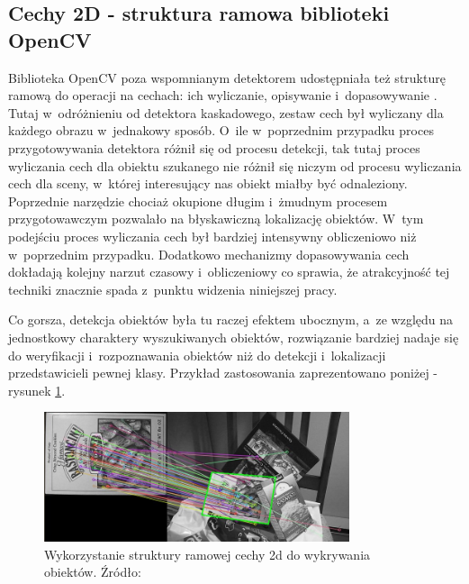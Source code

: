 \subsection{Cechy 2D - struktura ramowa biblioteki OpenCV}

Biblioteka OpenCV poza wspomnianym detektorem udostępniała też
strukturę ramową do operacji na cechach: ich wyliczanie, opisywanie
i~dopasowywanie \cite{OCV:feture2dframework}.
Tutaj w~odróżnieniu od detektora kaskadowego, zestaw cech
był wyliczany dla każdego obrazu w~jednakowy sposób. O~ile
w~poprzednim przypadku proces przygotowywania detektora różnił się
od procesu detekcji, tak tutaj proces wyliczania cech
dla obiektu szukanego nie różnił się niczym od procesu wyliczania
cech dla sceny, w~której interesujący nas obiekt miałby być odnaleziony.
Poprzednie narzędzie chociaż okupione długim i~żmudnym procesem
przygotowawczym pozwalało na błyskawiczną lokalizację obiektów.
W~tym podejściu proces wyliczania cech był bardziej
intensywny obliczeniowo niż w~poprzednim przypadku. 
Dodatkowo mechanizmy dopasowywania cech dokładają kolejny narzut
czasowy i~obliczeniowy co sprawia, że atrakcyjność tej techniki
znacznie spada z~punktu widzenia niniejszej pracy.

Co gorsza, detekcja obiektów była tu raczej efektem ubocznym,
a~ze względu na jednostkowy charaktery wyszukiwanych obiektów, rozwiązanie
bardziej nadaje się do weryfikacji i~rozpoznawania obiektów niż do
detekcji i~lokalizacji przedstawicieli pewnej klasy. Przykład zastosowania
zaprezentowano poniżej - rysunek \ref{fig:rev_features2d_detection}.

\begin{figure}[h!]
  \centering
  \includegraphics[width=0.8\textwidth]{img/rev_features2d_detection}
  \caption{Wykorzystanie struktury ramowej cechy 2d do wykrywania obiektów.
  	Źródło: \cite{OCV:feature_homography}}
  \label{fig:rev_features2d_detection}
\end{figure}

